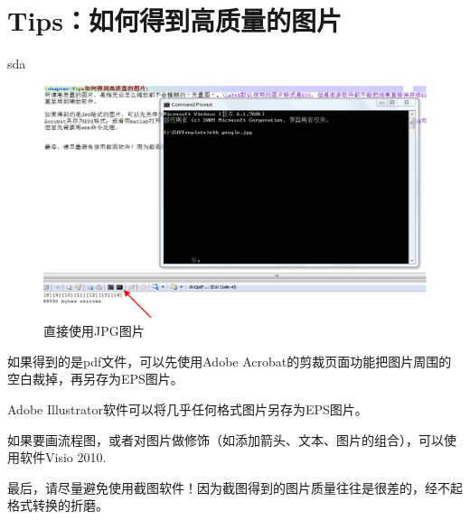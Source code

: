 \chapter{Tips：如何得到高质量的图片}

sda

\begin{figure}[htbp]
\begin{center}
	\includegraphics[width=0.8\linewidth]{command.jpg}
\end{center}
\caption{直接使用JPG图片}
\label{fig:google}
\end{figure}

如果得到的是pdf文件，可以先使用Adobe Acrobat的剪裁页面功能把图片周围的空白裁掉，再另存为EPS图片。

Adobe Illustrator软件可以将几乎任何格式图片另存为EPS图片。

如果要画流程图，或者对图片做修饰（如添加箭头、文本、图片的组合），可以使用软件Visio 2010.


最后，请尽量避免使用截图软件！因为截图得到的图片质量往往是很差的，经不起格式转换的折磨。




